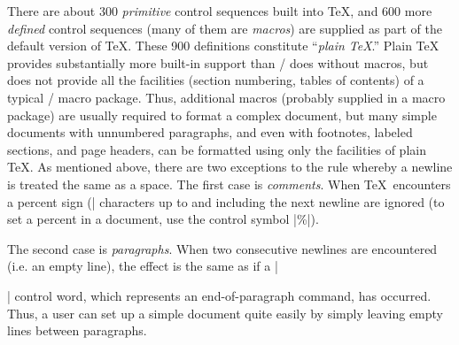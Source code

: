 There are about 300 {\sl primitive} control sequences built
into \TeX, and 600 more {\sl defined} control sequences (many
of them are {\sl macros}) are supplied as part of the default
version of \TeX.  These 900 definitions
constitute ``{\sl plain \TeX\/}.''  Plain \TeX{}
provides substantially more built-in support than \Troff/ does
without macros, but does not provide all the facilities
(section numbering, tables of contents) of a typical \Troff/ macro
package.  Thus, additional macros (probably supplied in
a macro package) are usually required to format
a complex document, but many simple documents with unnumbered
paragraphs, and even with footnotes, labeled sections,
and page headers,
can be formatted using only the facilities of plain \TeX.
As mentioned above, there are two exceptions to the rule
whereby a newline is treated the same as a space.  The
first case is {\sl comments\/}.  When \TeX\ encounters
a percent sign (|%
characters up to and including the next newline are ignored
(to set a percent in a document, use the control
symbol |\%|).

The second case is {\sl paragraphs\/}.  When two consecutive
newlines are encountered (i.e. an empty line), the effect is
the same as if a |\par| control word, which represents an
end-of-paragraph command, has occurred.  Thus, a user can set
up a simple document quite easily by simply leaving empty lines
between paragraphs.

